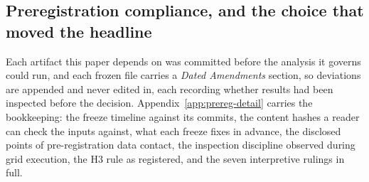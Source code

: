 %

\subsection{Preregistration compliance, and the choice that moved the headline}
\label{sec:prereg}
\label{sec:prereg:choices}

Each artifact this paper depends on was committed before the analysis it
governs could run, and each frozen file carries a \emph{Dated Amendments}
section, so deviations are appended and never edited in, each recording whether
results had been inspected before the decision.
Appendix~\ref{app:prereg-detail} carries the bookkeeping: the freeze timeline
against its commits, the content hashes a reader can check the inputs against,
what each freeze fixes in advance, the disclosed points of pre-registration data
contact, the inspection discipline observed during grid execution, the H3 rule
as registered, and the seven interpretive rulings in full.

